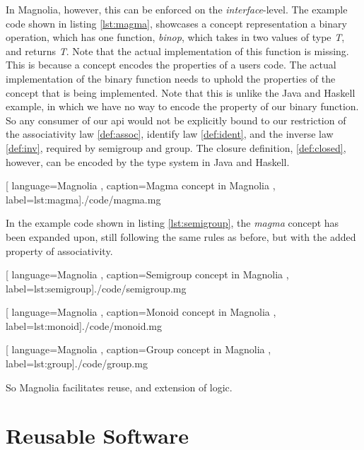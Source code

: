 In Magnolia, however, this can be enforced on the \textit{interface}-level. The
example code shown in listing \ref{lst:magma}, showcases a concept
representation a binary operation, which has one function, \textit{binop}, which
takes in two values of type \textit{T}, and returns \textit{T}. Note that the
actual implementation of this function is missing. This is because a concept
encodes the properties of a users code. The actual implementation of the
binary function needs to uphold the properties of the concept that is
being implemented. Note that this is unlike the Java and Haskell example, in
which we have no way to encode the property of our binary function. So any
consumer of our \gls{api} would not be explicitly bound to our restriction of
the associativity law \ref{def:assoc}, identify law \ref{def:ident}, and the
inverse law \ref{def:inv}, required by semigroup and group. The closure
definition, \ref{def:closed}, however, can be encoded by the type system in Java
and Haskell.

\begin{center}
  
    [ language=Magnolia
    , caption={Magma concept in Magnolia}
    , label=lst:magma]{./code/magma.mg}
\end{center}

In the example code shown in listing \ref{lst:semigroup}, the \textit{magma}
concept has been expanded upon, still following the same rules as before, but
with the added property of associativity.

\begin{center}
  
    [ language=Magnolia
    , caption={Semigroup concept in Magnolia}
    , label=lst:semigroup]{./code/semigroup.mg}
\end{center}

\begin{center}
  
    [ language=Magnolia
    , caption={Monoid concept in Magnolia}
    , label=lst:monoid]{./code/monoid.mg}
\end{center}

\begin{center}
  
    [ language=Magnolia
    , caption={Group concept in Magnolia}
    , label=lst:group]{./code/group.mg}
\end{center}

So Magnolia facilitates reuse, and extension of logic. 

\section{Reusable Software}

